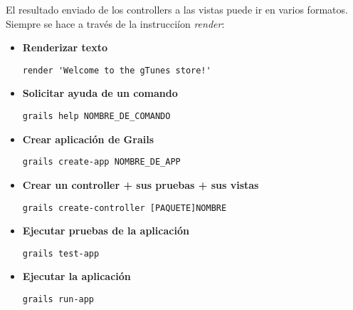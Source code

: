 %     
%     
El resultado enviado de los controllers a las vistas puede ir en varios formatos. Siempre se hace a trav\'es de la instrucci\'ion \textit{render}:
\begin{itemize}

    \item \textbf{Renderizar texto}    
        \begin{lstlisting}[gobble=11] 
            render 'Welcome to the gTunes store!'
        \end{lstlisting}

    \item \textbf{Solicitar ayuda de un comando}
        \begin{lstlisting}[gobble=11]
            grails help NOMBRE_DE_COMANDO
        \end{lstlisting}

    \item \textbf{Crear aplicaci\'on de Grails}
        \begin{lstlisting}[gobble=11]
            grails create-app NOMBRE_DE_APP
        \end{lstlisting}


    \item \textbf{Crear un controller + sus pruebas + sus vistas}
        \begin{lstlisting}[gobble=11]
            grails create-controller [PAQUETE]NOMBRE
        \end{lstlisting}

    \item \textbf{Ejecutar pruebas de la aplicaci\'on}
        \begin{lstlisting}[gobble=11]
            grails test-app
        \end{lstlisting}

    \item \textbf{Ejecutar la aplicaci\'on}
        \begin{lstlisting}[gobble=11]
            grails run-app
        \end{lstlisting}
        
\end{itemize}
